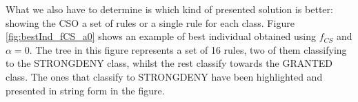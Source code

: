 \documentclass[runningheads]{llncs}
\begin{document}



What we also have to determine is which kind of presented solution is
better: showing the CSO a set of rules or a single rule for each
class.
%
%
Figure \ref{fig:bestInd_fCS_a0} shows an example of best individual
obtained using $f_{CS}$ and $\alpha = 0 $. The tree in this figure represents a set of 16 rules, two of them classifying to the STRONGDENY class, whilst the rest classify towards the GRANTED class. The ones that classify to STRONGDENY have been highlighted and presented in string form in the figure.
\end{document}
